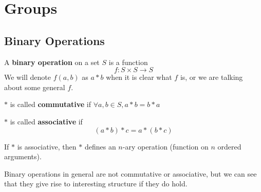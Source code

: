 \documentclass{report}
\begin{document}
\chapter{Groups}

\section{Binary Operations}

\begin{definition}
    A \textbf{binary operation} on a set $S$ is a function
    \begin{equation*}
        f: S \times S \rightarrow S
    \end{equation*}
    We will denote $f(a, b)$ as $a * b$ when it is clear what $f$ is, or we are talking about some general $f$.
\end{definition}

\begin{definition}
    $*$ is called \textbf{commutative} if $\forall a,b \in S, a * b = b* a$
\end{definition}


\begin{definition}
    $*$ is called \textbf{associative} if \begin{equation*}
        (a * b) * c = a * (b * c)
    \end{equation*}
\end{definition}

\begin{remark}
    If $*$ is associative, then $*$ defines an $n$-ary operation (function on $n$ ordered arguments).
\end{remark}

Binary operations in general are not commutative or associative, but we can see that they give rise to interesting structure if they do hold.
\end{document}
